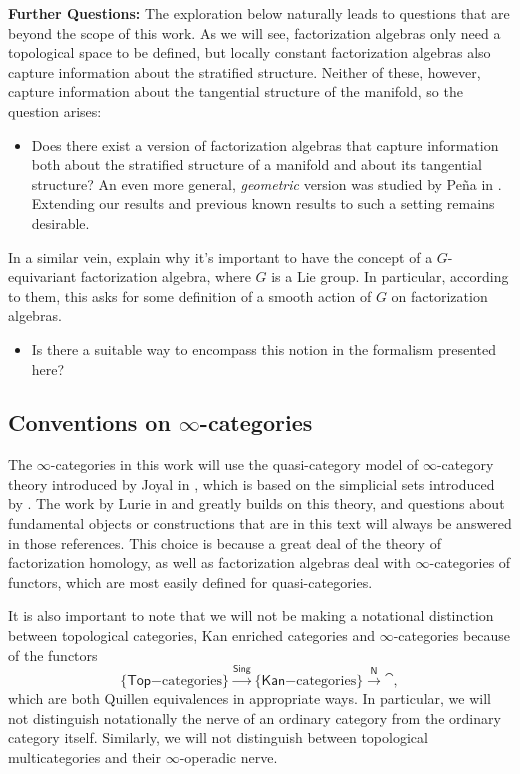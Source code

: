 \documentclass[../text]{subfiles}
\begin{document}
\textbf{Further Questions:} The exploration below naturally leads to questions that are beyond the scope of this work. As we will see, factorization algebras only need a topological space to be defined, but locally constant factorization algebras also capture information about the stratified structure. Neither of these, however, capture information about the tangential structure of the manifold, so the question arises:
%
\begin{itemize}
    \item Does there exist a version of factorization algebras that capture information both about the stratified structure of a manifold and about its tangential structure? An even more general, \emph{geometric} version was studied by Pe\~{n}a in \cite{pena2022geometric}. Extending our results and previous known results to such a setting remains desirable.
\end{itemize}
%
In a similar vein, \cite{cg2016} explain why it's important to have the concept of a $G$-equivariant factorization algebra, where $G$ is a Lie group. In particular, according to them, this asks for some definition of a smooth action of $G$ on factorization algebras.
%
\begin{itemize}
    \item Is there a suitable way to encompass this notion in the formalism presented here?
\end{itemize}




\subsection{Conventions on \texorpdfstring{$\infty$}{infinity}-categories}

The $\infty$-categories in this work will use the quasi-category model of $\infty$-category theory introduced by Joyal in \cite{joyal}, which is based on the simplicial sets introduced by \cite{bv73}. The work by Lurie in \cite{lurie_htt} and \cite{lurie_ha} greatly builds on this theory, and questions about fundamental objects or constructions that are in this text will always be answered in those references. This choice is because a great deal of the theory of factorization homology, as well as factorization algebras deal with $\infty$-categories of functors, which are most easily defined for quasi-categories.

It is also important to note that we will not be making a notational distinction between topological categories, Kan enriched categories and $\infty$-categories because of the functors
%
\begin{equation}
    \{ \mathsf{Top}\mathrm{-categories}\} \xrightarrow{\mathsf{Sing}} \{ \mathsf{Kan}\mathrm{-categories}\} \xrightarrow{\mathsf{N}} \cat,
\end{equation}
%
which are both Quillen equivalences in appropriate ways. In particular, we will not distinguish notationally the nerve of an ordinary category from the ordinary category itself. Similarly, we will not distinguish between topological multicategories and their $\infty$-operadic nerve.
\end{document}
